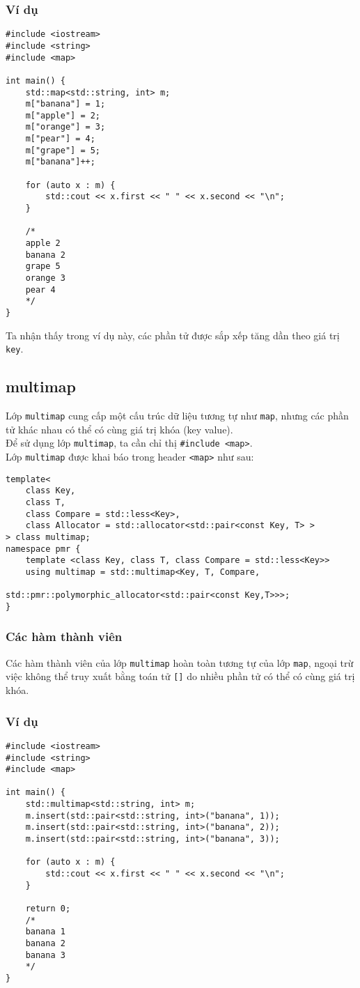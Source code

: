 \subsubsection{Ví dụ}
\begin{lstlisting}
#include <iostream>
#include <string>
#include <map>
 
int main() {
    std::map<std::string, int> m;
    m["banana"] = 1;
    m["apple"] = 2;
    m["orange"] = 3;
    m["pear"] = 4;
    m["grape"] = 5;
    m["banana"]++;
 
    for (auto x : m) {
        std::cout << x.first << " " << x.second << "\n";
    }
    
    /*
    apple 2
    banana 2
    grape 5
    orange 3
    pear 4
    */
}
\end{lstlisting}
Ta nhận thấy trong ví dụ này, các phần tử được sắp xếp tăng dần theo giá trị \lstinline{key}.

\subsection{multimap}
Lớp \lstinline{multimap} cung cấp  một cấu trúc dữ liệu tương tự như \lstinline{map}, nhưng các phần tử khác nhau có thể có cùng giá trị khóa (key value).\\
Để sử dụng lớp \lstinline{multimap},  ta cần chỉ thị \lstinline{#include <map>}.\\
Lớp \lstinline{multimap} được khai báo trong header  \lstinline{<map>} như sau: \cite{multimap}
\begin{lstlisting}
template<
    class Key,
    class T,
    class Compare = std::less<Key>,
    class Allocator = std::allocator<std::pair<const Key, T> >
> class multimap;
namespace pmr {
    template <class Key, class T, class Compare = std::less<Key>>
    using multimap = std::multimap<Key, T, Compare,
                                  std::pmr::polymorphic_allocator<std::pair<const Key,T>>>;
}
\end{lstlisting}
\subsubsection{Các hàm thành viên}
Các hàm thành viên của lớp \lstinline{multimap} hoàn toàn tương tự của lớp \lstinline{map}, ngoại trừ việc không thể truy xuất bằng toán tử \lstinline{[]} do nhiều phần tử có thể có cùng giá trị khóa.
\subsubsection{Ví dụ}
\begin{lstlisting}
#include <iostream>
#include <string>
#include <map>
 
int main() {
    std::multimap<std::string, int> m;
    m.insert(std::pair<std::string, int>("banana", 1));
    m.insert(std::pair<std::string, int>("banana", 2));
    m.insert(std::pair<std::string, int>("banana", 3));
 
    for (auto x : m) {
        std::cout << x.first << " " << x.second << "\n";
    }
 
    return 0;
    /*
    banana 1
    banana 2
    banana 3
    */
}
\end{lstlisting}
